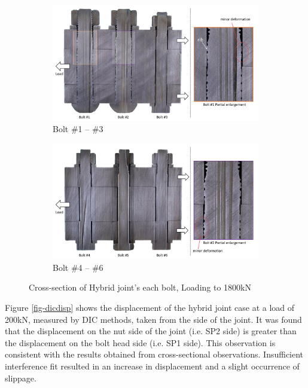 \begin{figure}
    \centering
    \begin{subfigure}[t]{0.85\textwidth}
    \centering
    \includegraphics[width=\linewidth]{imgs/ch6/cros-sec-ob1.pdf}
    \caption{Bolt \#1 -- \#3}
    \label{fig-csob1}
    \end{subfigure}
    \begin{subfigure}[t]{0.85\textwidth}
    \centering
    \includegraphics[width=\linewidth]{imgs/ch6/cros-sec-ob2.pdf}
    \caption{Bolt \#4 -- \#6}
    \label{fig-csob2}
    \end{subfigure}
    \caption{Cross-section of Hybrid joint's each bolt, Loading to 1800kN}
    \label{fig-csob}
\end{figure}


Figure \ref{fig-dicdisp} shows the displacement of the hybrid joint case at a load of 200kN, measured by DIC methods, taken from the side of the joint. It was found that the displacement on the nut side of the joint (i.e. SP2 side) is greater than the displacement on the bolt head side (i.e. SP1 side). This observation is consistent with the results obtained from cross-sectional observations. Insufficient interference fit resulted in an increase in displacement and a slight occurrence of slippage.

